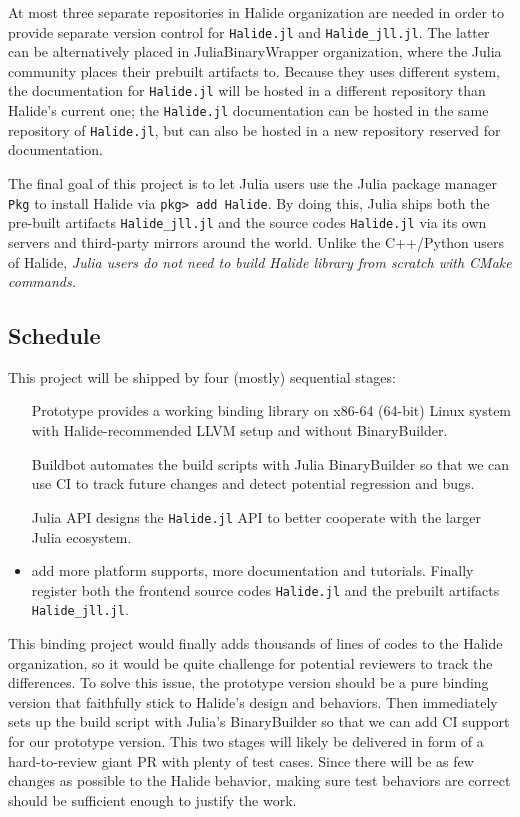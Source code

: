 \documentclass{article}
\begin{document}
At most three separate repositories in Halide organization are needed in order to provide separate version control for \lstinline{Halide.jl} and \lstinline{Halide_jll.jl}. The latter can be alternatively placed in JuliaBinaryWrapper organization, where the Julia community places their prebuilt artifacts to. Because they uses different system, the documentation for \lstinline{Halide.jl} will be hosted in a different repository than Halide's current one; the \lstinline{Halide.jl} documentation can be hosted in the same repository of \lstinline{Halide.jl}, but can also be hosted in a new repository reserved for documentation.

The final goal of this project is to let Julia users use the Julia package manager \lstinline{Pkg} to install Halide via \lstinline{pkg> add Halide}. By doing this, Julia ships both the pre-built artifacts \lstinline{Halide_jll.jl} and the source codes \lstinline{Halide.jl} via its own servers and third-party mirrors around the world. Unlike the C++/Python users of Halide, \emph{Julia users do not need to build Halide library from scratch with CMake commands.}


\subsection{Schedule}

This project will be shipped by four (mostly) sequential stages:

\begin{itemize}
    \item [Prototype] provides a working binding library on x86-64 (64-bit) Linux system with Halide-recommended LLVM setup and without BinaryBuilder.
    \item [Buildbot] automates the build scripts with Julia BinaryBuilder so that we can use CI to track future changes and detect potential regression and bugs.
    \item [Julia API] designs the \lstinline{Halide.jl} API to better cooperate with the larger Julia ecosystem.
    \item [Release] add more platform supports, more documentation and tutorials. Finally register both the frontend source codes \lstinline{Halide.jl} and the prebuilt artifacts \lstinline{Halide_jll.jl}.
\end{itemize}

This binding project would finally adds thousands of lines of codes to the Halide organization, so it would be quite challenge for potential reviewers to track the differences. To solve this issue, the prototype version should be a pure binding version that faithfully stick to Halide's design and behaviors. Then immediately sets up the build script with Julia's BinaryBuilder so that we can add CI support for our prototype version. This two stages will likely be delivered in form of a hard-to-review giant PR with plenty of test cases. Since there will be as few changes as possible to the Halide behavior, making sure test behaviors are correct should be sufficient enough to justify the work.
\end{document}

